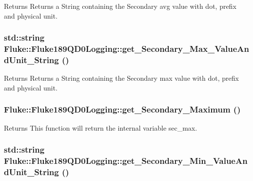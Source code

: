 \label{classFluke_1_1Fluke189QD0Logging_a34ee9e63eb8b4b44e76fcde20856898c}
\begin{DoxyReturn}{Returns}
Returns a String containing the Secondary avg value with dot, prefix and physical unit. 
\end{DoxyReturn}
\hypertarget{classFluke_1_1Fluke189QD0Logging_a57918fff03c4c54763b13ee3da0e6ea2}{
\subsubsection[{get\_\-Secondary\_\-Max\_\-ValueAndUnit\_\-String}]{\setlength{\rightskip}{0pt plus 5cm}std::string Fluke::Fluke189QD0Logging::get\_\-Secondary\_\-Max\_\-ValueAndUnit\_\-String ()}}
\label{classFluke_1_1Fluke189QD0Logging_a57918fff03c4c54763b13ee3da0e6ea2}
\begin{DoxyReturn}{Returns}
Returns a String containing the Secondary max value with dot, prefix and physical unit. 
\end{DoxyReturn}
\hypertarget{classFluke_1_1Fluke189QD0Logging_a368a2503ede00bd9ef45937fc76278ea}{
\subsubsection[{get\_\-Secondary\_\-Maximum}]{ Fluke::Fluke189QD0Logging::get\_\-Secondary\_\-Maximum ()}}
\label{classFluke_1_1Fluke189QD0Logging_a368a2503ede00bd9ef45937fc76278ea}
\begin{DoxyReturn}{Returns}
This function will return the internal variable sec\_\-max. 
\end{DoxyReturn}
\hypertarget{classFluke_1_1Fluke189QD0Logging_a592eb82801467a79a5bdd133bb5e5840}{
\subsubsection[{get\_\-Secondary\_\-Min\_\-ValueAndUnit\_\-String}]{\setlength{\rightskip}{0pt plus 5cm}std::string Fluke::Fluke189QD0Logging::get\_\-Secondary\_\-Min\_\-ValueAndUnit\_\-String ()}}
